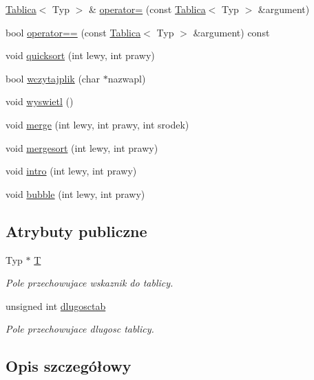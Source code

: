 \begin{DoxyCompactItemize}
\hyperlink{class_tablica}{Tablica}$<$ Typ $>$ \& \hyperlink{class_tablica_a3626fbc8c7e54b24e7fba96b86a4173f}{operator=} (const \hyperlink{class_tablica}{Tablica}$<$ Typ $>$ \&argument)
\item 
bool \hyperlink{class_tablica_a5feb149bbeae655c6d7bafada90f9615}{operator==} (const \hyperlink{class_tablica}{Tablica}$<$ Typ $>$ \&argument) const 
\item 
void \hyperlink{class_tablica_a56d18f9872a1f48b9817334eba662437}{quicksort} (int lewy, int prawy)
\item 
bool \hyperlink{class_tablica_a0c9690c0fff4d5a704318ae93f264b0f}{wczytajplik} (char $\ast$nazwapl)
\item 
void \hyperlink{class_tablica_acdaaf0758537334d35779497a1d60900}{wyswietl} ()
\item 
void \hyperlink{class_tablica_a045ff88c70192a28c4fc4fd7585cad42}{merge} (int lewy, int prawy, int srodek)
\item 
void \hyperlink{class_tablica_a10405980a5d57f53ce38fa91fae0a38b}{mergesort} (int lewy, int prawy)
\item 
void \hyperlink{class_tablica_aac9cef276e6db6746cd57f3fa08ee9a6}{intro} (int lewy, int prawy)
\item 
void \hyperlink{class_tablica_a5f6d42f9f1da7aeca51618f25532e2aa}{bubble} (int lewy, int prawy)
\end{DoxyCompactItemize}
\subsection*{Atrybuty publiczne}
\begin{DoxyCompactItemize}
\item 
Typ $\ast$ \hyperlink{class_tablica_a8a186bd43f434e2c8b58377f6a54ab47}{T}
\begin{DoxyCompactList}\small\item\em Pole przechowujace wskaznik do tablicy. \end{DoxyCompactList}\item 
unsigned int \hyperlink{class_tablica_a42b49425f0e086c4e958337dcba3a3b6}{dlugosctab}
\begin{DoxyCompactList}\small\item\em Pole przechowujace dlugosc tablicy. \end{DoxyCompactList}\end{DoxyCompactItemize}


\subsection{Opis szczegółowy}
